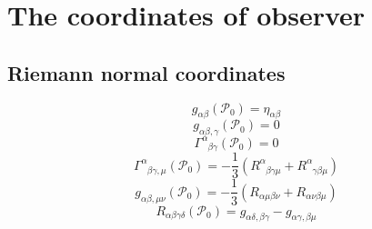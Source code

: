 \section{The coordinates of observer}
\subsection{Riemann normal coordinates}
\[g_{\alpha \beta}(\mathcal{P}_0) = \eta_{\alpha \beta}\]
\[g_{\alpha \beta,\gamma}(\mathcal{P}_0) = 0\]
\[\Gamma^{\alpha}_{\phantom{\alpha} \beta \gamma}(\mathcal{P}_0) = 0\]
\[\Gamma^{\alpha}_{\phantom{\alpha} \beta \gamma,\mu}(\mathcal{P}_0) = -\frac{1}{3} (R^{\alpha}_{\phantom{\alpha} \beta \gamma \mu} + R^{\alpha}_{\phantom{\alpha} \gamma \beta \mu})\]
\[g_{\alpha \beta,\mu \nu}(\mathcal{P}_0) = -\frac{1}{3} (R_{\alpha \mu \beta \nu} +R_{\alpha \nu \beta \mu})\]
\[R_{\alpha \beta \gamma \delta}(\mathcal{P}_0) = g_{\alpha \delta, \beta \gamma} - g_{\alpha \gamma , \beta \mu}\]

